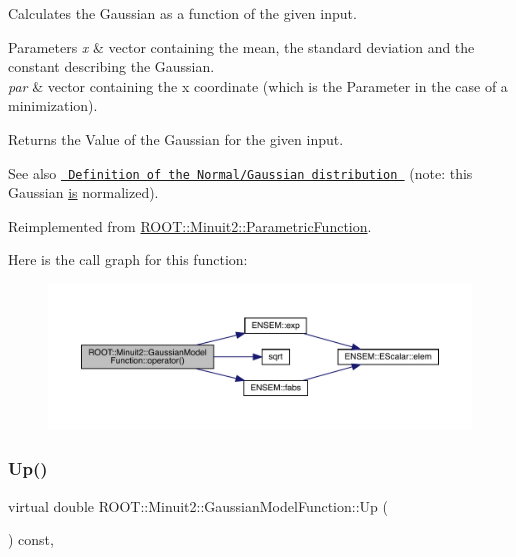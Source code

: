 Calculates the Gaussian as a function of the given input.


\begin{DoxyParams}{Parameters}
{\em x} & vector containing the mean, the standard deviation and the constant describing the Gaussian.\\
\hline
{\em par} & vector containing the x coordinate (which is the Parameter in the case of a minimization).\\
\hline
\end{DoxyParams}
\begin{DoxyReturn}{Returns}
the Value of the Gaussian for the given input.
\end{DoxyReturn}
\begin{DoxySeeAlso}{See also}
\href{http://mathworld.wolfram.com/NormalDistribution.html}{\texttt{ Definition of the Normal/\+Gaussian distribution }} (note\+: this Gaussian \mbox{\hyperlink{x_8cc_a81abbbdef81e25584a2eab888e643d3d}{is}} normalized). 
\end{DoxySeeAlso}


Reimplemented from \mbox{\hyperlink{classROOT_1_1Minuit2_1_1ParametricFunction_a5fab6e804e0f93bd593580f582b0f7c5}{R\+O\+O\+T\+::\+Minuit2\+::\+Parametric\+Function}}.

Here is the call graph for this function\+:\nopagebreak
\begin{figure}[H]
\begin{center}
\leavevmode
\includegraphics[width=350pt]{d4/df6/classROOT_1_1Minuit2_1_1GaussianModelFunction_ab74ced8f50ef3831c8142de54877e726_cgraph}
\end{center}
\end{figure}
\mbox{\label{classROOT_1_1Minuit2_1_1GaussianModelFunction_ae99a5c50055e4563a2252ba8ceb19d20}} 
\subsubsection{\texorpdfstring{Up()}{Up()}}
{\footnotesize\ttfamily virtual double R\+O\+O\+T\+::\+Minuit2\+::\+Gaussian\+Model\+Function\+::\+Up (\begin{DoxyParamCaption}{ }\end{DoxyParamCaption}) const\hspace{0.3cm}{\ttfamily [inline]}, {\ttfamily [virtual]}}

